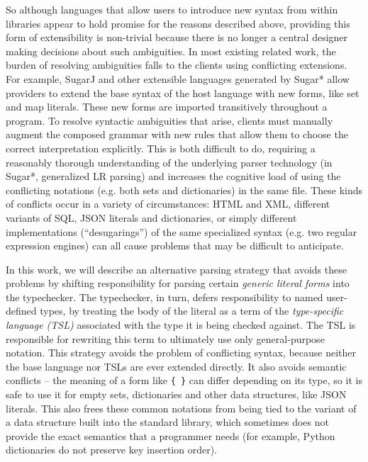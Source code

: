 So although languages that allow users to introduce new syntax from within libraries appear to hold promise for the reasons described above, providing this form of extensibility is non-trivial because there is no longer a central designer making decisions about such ambiguities. In most existing related work, the burden of resolving ambiguities falls to the clients using conflicting extensions. For example, SugarJ \cite{erdweg2011sugarj} and other extensible languages generated by Sugar* \cite{erdweg2013framework} allow providers to extend the base syntax of the host language with new forms, like set and map literals. These new forms are imported transitively throughout a program. To resolve syntactic ambiguities that arise, clients must manually augment the composed grammar with new rules that allow them to choose the correct interpretation explicitly. This is both difficult to do, requiring a reasonably thorough understanding of the underlying parser technology (in Sugar*, generalized LR parsing) and increases the cognitive load of using the conflicting notations (e.g. both sets and dictionaries) in the same file. These kinds of conflicts occur in a variety of circumstances: HTML and XML, different variants of SQL, JSON literals and dictionaries, or simply different implementations (``desugarings'') of the same specialized syntax (e.g. two regular expression engines) can all cause problems that may be difficult to anticipate.

In this work, we will describe an alternative parsing strategy that avoids these problems by shifting responsibility for parsing certain \emph{generic literal forms} into the typechecker. The typechecker, in turn, defers responsibility to named user-defined types, by treating the body of the literal as a term of the   \emph{type-specific language (TSL)} associated with the type it is being checked against. The TSL is responsible for rewriting this term to ultimately use only general-purpose notation. This strategy avoids the problem of conflicting syntax, because neither the base language nor TSLs are ever extended directly. It also avoids semantic conflicts -- the meaning of a form like \verb|{ }| can differ depending  on its type, so it is safe to use it for empty sets, dictionaries and other data structures, like JSON literals. This also frees these common notations from being tied to the variant of a  data structure built into the standard library, which sometimes does not provide the exact semantics that a programmer needs (for example, Python dictionaries do not preserve key insertion order).
